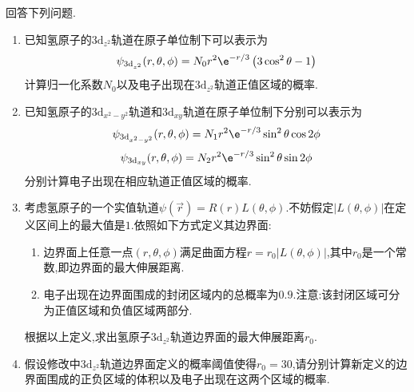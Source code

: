 \documentclass{ctexart}
\begin{document}
\begin{homework}[5.]
    回答下列问题.
    \begin{enumerate}[label=\tbf{(\alph*)}]
        \item 已知氢原子的$3\text{d}_{z^2}$轨道在原子单位制下可以表示为
        \[\psi_{3\text{d}_{z^2}}(r,\theta,\phi)=N_0r^2\e^{-r/3}\left(3\cos^2\theta-1\right)\]
        计算归一化系数$N_0$以及电子出现在$3\text{d}_{z^2}$轨道正值区域的概率.
        \item 已知氢原子的$3\text{d}_{x^2-y^2}$轨道和$3\text{d}_{xy}$轨道在原子单位制下分别可以表示为
        \[\psi_{3\text{d}_{x^2-y^2}}(r,\theta,\phi)=N_1r^2\e^{-r/3}\sin^2\theta\cos2\phi\]
        \[\psi_{3\text{d}_{xy}}(r,\theta,\phi)=N_2r^2\e^{-r/3}\sin^2\theta\sin2\phi\]
        分别计算电子出现在相应轨道正值区域的概率.
        \item 考虑氢原子的一个实值轨道$\psi(\vec{r})=R(r)L(\theta,\phi)$.不妨假定$\left|L(\theta,\phi)\right|$在定义区间上的最大值是$1$.依照如下方式定义其边界面:\begin{enumerate}[label=(\arabic*)]
            \item 边界面上任意一点$(r,\theta,\phi)$满足曲面方程$r=r_0\left|L(\theta,\phi)\right|$,其中$r_0$是一个常数,即边界面的最大伸展距离.
            \item 电子出现在边界面围成的封闭区域内的总概率为$0.9$.注意:该封闭区域可分为正值区域和负值区域两部分.
        \end{enumerate}
        根据以上定义,求出氢原子$3\text{d}_{z^2}$轨道边界面的最大伸展距离$r_0$.
        \item  假设修改中$3\text{d}_{z^2}$轨道边界面定义的概率阈值使得$r_0=30$,请分别计算新定义的边界面围成的正负区域的体积以及电子出现在这两个区域的概率.
    \end{enumerate}
\end{homework}
\end{document}
